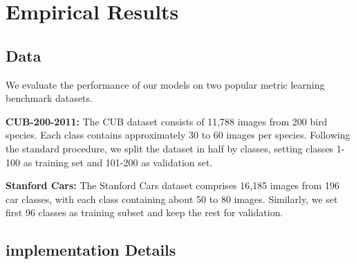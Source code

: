 \documentclass[10pt, letterpaper, twocolumn]{article}
\begin{document}
\section{Empirical Results}

\subsection{Data}

We evaluate the performance of our models on two popular metric learning benchmark datasets.

\textbf{CUB-200-2011:} The CUB dataset \cite{wah_caltech-ucsd_2011} consists of 11,788 images from 200 bird species. Each class contains approximately 30 to 60 images per species. Following the standard procedure, we split the dataset in half by classes, setting classes 1-100 as training set and 101-200 as validation set.

\textbf{Stanford Cars:} The Stanford Cars dataset \cite{krause_3d_2013} comprises 16,185 images from 196 car classes, with each class containing about 50 to 80 images. Similarly, we set first 96 classes as training subset and keep the rest for validation.

\subsection{implementation Details}
\end{document}
